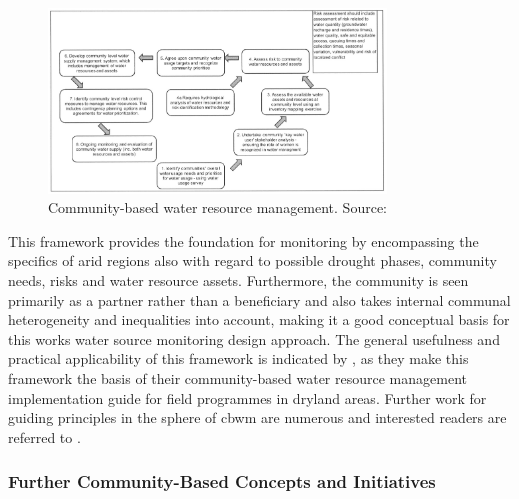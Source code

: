 \begin{figure}[!hbp]
    \centering
    \includegraphics[width=0.8\textwidth]{figures/2023_MA_th_day_iwrm.jpg}
    \decoRule
    \caption[Community-based water resource management]{Community-based water resource management. Source: \autocite{dayCommunitybasedWaterResources2009}}
    \label{fig:th_day_iwrm}
\end{figure}

This framework provides the foundation for monitoring by encompassing the specifics of arid regions also with regard to possible drought phases, community needs, risks and water resource assets. Furthermore, the community is seen primarily as a partner rather than a beneficiary and also takes internal communal heterogeneity and inequalities into account, making it a good conceptual basis for this works water source monitoring design approach. The general usefulness and practical applicability of this framework is indicated by \autocite{oxfamIntroductionCommunityBasedWater2009}, as they make this framework the basis of their community-based water resource management implementation guide for field programmes in dryland areas. Further work for guiding principles in the sphere of \acrshort{cbwm} are numerous and interested readers are referred to \autocite{westonCommunityBasedWaterMonitoring2015}.

\subsubsection*{Further Community-Based Concepts and Initiatives}\label{subsec:cbc} %

